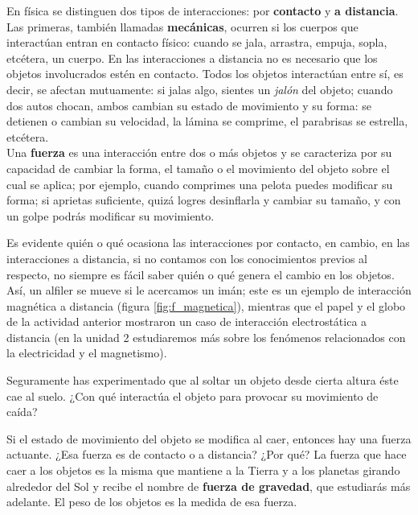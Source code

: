 \documentclass[11pt]{book}
\begin{document}
\begin{minipage}[t]{0.55\textwidth}

    En física se distinguen dos tipos de interacciones: por \textbf{contacto} y \textbf{a distancia}.
    Las primeras, también llamadas \textbf{mecánicas}, ocurren si los cuerpos que interactúan entran
    en contacto físico: cuando se jala, arrastra, empuja, sopla, etcétera, un cuerpo.
    En las interacciones a distancia no es necesario que los objetos involucrados estén en contacto.
    Todos los objetos interactúan entre sí, es decir, se afectan mutuamente: si jalas algo,
    sientes un \emph{jalón} del objeto; cuando dos autos chocan, ambos cambian su estado de movimiento
    y su forma: se detienen o cambian su velocidad, la lámina se comprime, el parabrisas se estrella,
    etcétera.\\

    Una \textbf{fuerza} es una interacción entre dos o más objetos y se caracteriza por su capacidad de
    cambiar la forma, el tamaño o el movimiento del objeto sobre el cual se aplica; por ejemplo,
    cuando comprimes una pelota puedes modificar su forma; si aprietas suficiente, quizá logres
    desinflarla y cambiar su tamaño, y con un golpe podrás modificar su movimiento.

    Es evidente quién o qué ocasiona las interacciones por contacto, en cambio, en las interacciones
    a distancia, si no contamos con los conocimientos previos al respecto, no siempre es fácil
    saber quién o qué genera el cambio en los objetos. Así, un alfiler se mueve si le acercamos
    un imán; este es un ejemplo de interacción magnética a distancia (figura \ref{fig:f_magnetica}),
    mientras que
    el papel y el globo de la actividad anterior mostraron un caso de interacción electrostática
    a distancia (en la unidad 2 estudiaremos más sobre los fenómenos relacionados con la electricidad
    y el magnetismo).

    Seguramente has experimentado que al soltar un objeto desde cierta altura éste cae al suelo.
    ¿Con qué interactúa el objeto para provocar su movimiento de caída?
\end{minipage}

Si el estado de movimiento
del objeto se modifica al caer, entonces hay una fuerza actuante. ¿Esa fuerza es de contacto o
a distancia? ¿Por qué?
La fuerza que hace caer a los objetos es la misma que mantiene a la Tierra y a los planetas
girando alrededor del Sol y recibe el nombre de \textbf{fuerza de gravedad}, que estudiarás más
adelante.
El peso de los objetos es la medida de esa fuerza.
\end{document}
